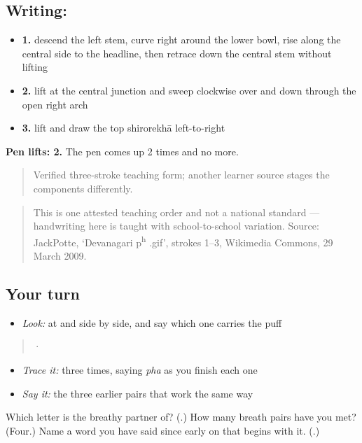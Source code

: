 \subsection*{Writing: }

\begin{itemize}
\raggedright
  \item \textbf{1.} descend the left stem, curve right around the lower bowl, rise along the central side to the headline, then retrace down the central stem without lifting
  \item \textbf{2.} lift at the central junction and sweep clockwise over and down through the open right arch
  \item \textbf{3.} lift and draw the top shirorekhā left-to-right
\end{itemize}

\textbf{Pen lifts: 2.} The pen comes up 2 times and no more.

\begin{quote}
Verified three-stroke teaching form; another learner source stages the components differently.
\end{quote}

\begin{quote}
This is one attested teaching order and not a national standard — handwriting here is taught with school-to-school variation. Source: JackPotte, ‘Devanagari p\textsuperscript{h} .gif’, strokes 1–3, Wikimedia Commons, 29 March 2009.
\end{quote}

\subsection*{Your turn}
\begin{itemize}
\raggedright
  \item \emph{Look:} at  and  side by side, and say which one carries the puff
\end{itemize}

\begin{quote}
  ·  
\end{quote}

\begin{itemize}
\raggedright
  \item \emph{Trace it:}  three times, saying \emph{pha} as you finish each one
  \item \emph{Say it:} the three earlier pairs that work the same way
\end{itemize}

\begin{tcolorbox}[breakable,colback=teal!4,colframe=teal!35!black,title={Before you move on}]
Which letter is \textbf{} the breathy partner of? (\textbf{}.) How many breath pairs have you met? (Four.) Name a word you have said since early on that begins with it. (\textbf{}.)
\end{tcolorbox}
